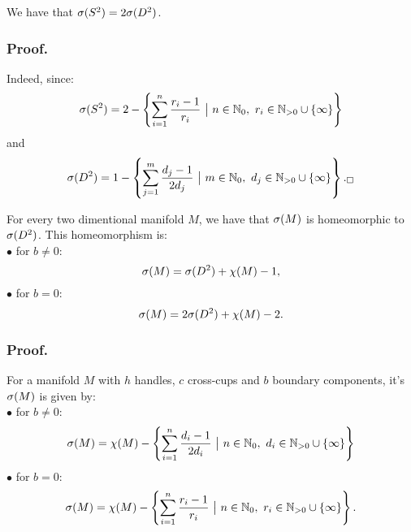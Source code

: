\begin{observation}\label{2times homeomorphism}
We have that ${{\sigma}(S^2)} = 2{{\sigma}(D^2)}$.
\end{observation}
\subsubsection{Proof.}

Indeed, since: 
\begin{align}
\spe(S^2) = 2 -\left\{\sum\limits_{i=1}^n \frac{r_i-1}{r_i}\ \big|\ n\in\mathbb{N}_0,\ 
r_i\in\mathbb{N}_{>0}\cup \{\infty\}\right\}
\end{align}
and 
\begin{align}
\spe(D^2) = 1 - \left\{\sum\limits_{j=1}^m\frac{d_j-1}{2d_j}\ 
\big|\ m\in\mathbb{N}_0,\ d_j\in\mathbb{N}_{>0}\cup \{\infty\}\right\}._\square
\end{align}

\begin{observation}\label{all_spectra_are_isomorphic}\label{spe_M}
For every two dimentional manifold $M$, we have that ${\sigma}(M)$ is homeomorphic to ${{\sigma}(D^2)}$. 
This homeomorphism is: \\
$\bullet$ for $b \neq 0$:
\begin{equation}
{\sigma}(M) = {{\sigma}(D^2)} + \chi(M) - 1, 
\end{equation}
$\bullet$ for $b = 0$:
\begin{equation}
{\sigma}(M) = 2{{\sigma}(D^2)} + \chi(M) - 2.
\end{equation}  
\end{observation}

\subsubsection{Proof.}
For a manifold $M$ with $h$ handles, $c$ cross-cups and $b$ boundary components, it's 
${{\sigma}(M)}$ is given by:\\
$\bullet$ for $b\neq 0$: 
\begin{equation}
\spe(M) = \chi(M) - \left\{\sum\limits_{i=1}^n\frac{d_i-1}{2d_i}\ 
\big|\ n\in\mathbb{N}_0,\ d_i\in\mathbb{N}_{>0}\cup \{\infty\}\right\}
\end{equation}
$\bullet$ for $b = 0$:
\begin{equation}
\spe(M) = \chi(M) - \left\{\sum\limits_{i=1}^n \frac{r_i-1}{r_i}\ \big|\ n\in\mathbb{N}_0,\ 
r_i\in\mathbb{N}_{>0}\cup \{\infty\}\right\}.
\end{equation} 

